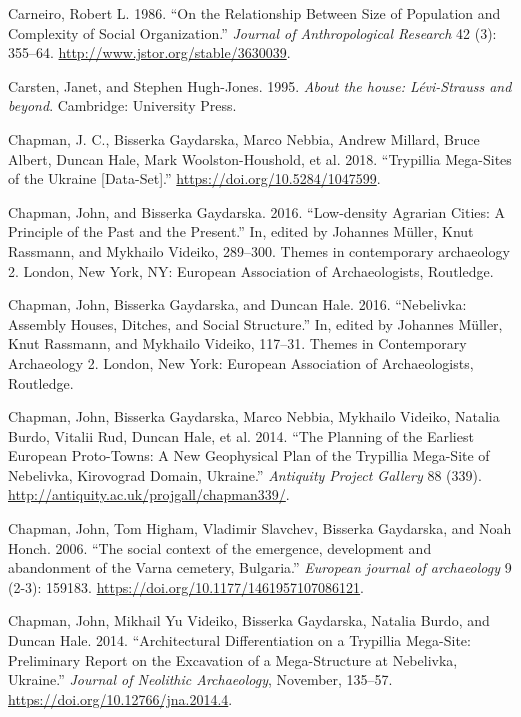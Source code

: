 \documentclass[
  12pt,
  a4paper, twoside]{book}
\newlength{\cslhangindent}
\newlength{\cslentryspacingunit} %
\newenvironment{CSLReferences}[2] %
 {%
  \setlength{\parindent}{0pt}
  \ifodd #1
  \let\oldpar\par
  \def\par{\hangindent=\cslhangindent\oldpar}
  \fi
  \setlength{\parskip}{#2\cslentryspacingunit}
 }%
 {}
\begin{document}
\begin{CSLReferences}{1}{0}
\leavevmode{}%
Carneiro, Robert L. 1986. {``On the Relationship Between Size of Population and Complexity of Social Organization.''} \emph{Journal of Anthropological Research} 42 (3): 355--64. \url{http://www.jstor.org/stable/3630039}.

\leavevmode{}%
Carsten, Janet, and Stephen Hugh-Jones. 1995. \emph{About the house: Lévi-Strauss and beyond}. Cambridge: University Press.

\leavevmode{}%
Chapman, J. C., Bisserka Gaydarska, Marco Nebbia, Andrew Millard, Bruce Albert, Duncan Hale, Mark Woolston-Houshold, et al. 2018. {``Trypillia Mega-Sites of the Ukraine {[}Data-Set{]}.''} \url{https://doi.org/10.5284/1047599}.

\leavevmode{}%
Chapman, John, and Bisserka Gaydarska. 2016. {``Low-density Agrarian Cities: A Principle of the Past and the Present.''} In, edited by Johannes Müller, Knut Rassmann, and Mykhailo Videiko, 289--300. Themes in contemporary archaeology 2. London, New York, NY: European Association of Archaeologists, Routledge.

\leavevmode{}%
Chapman, John, Bisserka Gaydarska, and Duncan Hale. 2016. {``Nebelivka: Assembly Houses, Ditches, and Social Structure.''} In, edited by Johannes Müller, Knut Rassmann, and Mykhailo Videiko, 117--31. Themes in Contemporary Archaeology 2. London, New York: European Association of Archaeologists, Routledge.

\leavevmode{}%
Chapman, John, Bisserka Gaydarska, Marco Nebbia, Mykhailo Videiko, Natalia Burdo, Vitalii Rud, Duncan Hale, et al. 2014. {``The Planning of the Earliest European Proto-Towns: A New Geophysical Plan of the Trypillia Mega-Site of Nebelivka, Kirovograd Domain, Ukraine.''} \emph{Antiquity Project Gallery} 88 (339). \url{http://antiquity.ac.uk/projgall/chapman339/}.

\leavevmode{}%
Chapman, John, Tom Higham, Vladimir Slavchev, Bisserka Gaydarska, and Noah Honch. 2006. {``The social context of the emergence, development and abandonment of the Varna cemetery, Bulgaria.''} \emph{European journal of archaeology} 9 (2-3): 159183. \url{https://doi.org/10.1177/1461957107086121}.

\leavevmode{}%
Chapman, John, Mikhail Yu Videiko, Bisserka Gaydarska, Natalia Burdo, and Duncan Hale. 2014. {``Architectural Differentiation on a Trypillia Mega-Site: Preliminary Report on the Excavation of a Mega-Structure at Nebelivka, Ukraine.''} \emph{Journal of Neolithic Archaeology}, November, 135--57. \url{https://doi.org/10.12766/jna.2014.4}.


\end{CSLReferences}
\end{document}
